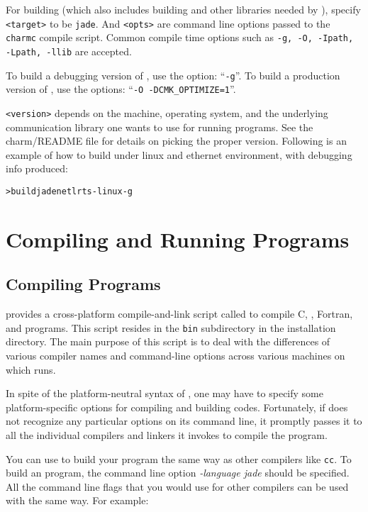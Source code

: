 \documentclass[10pt]{article}
\begin{document}
For building \jade (which also includes building \charmpp{} and other
libraries needed by \jade), specify \verb+<target>+ to be \verb+jade+. And
\verb+<opts>+ are command line options passed to the \verb+charmc+ compile
script.  Common compile time options such as \texttt{-g, -O, -Ipath, -Lpath,
-llib} are accepted. 

To build a debugging version of \jade, use the option: ``\texttt{-g}''. 
To build a production version of \jade, use the options: ``\texttt{-O 
-DCMK\_OPTIMIZE=1}''.

\verb+<version>+ depends on the machine, operating system, and the underlying
communication library one wants to use for running \jade programs.
See the charm/README file for details on picking the proper version.
Following is an example of how to build \jade under linux and ethernet
environment, with debugging info produced:

\begin{alltt}
> build jade netlrts-linux -g
\end{alltt}

\section{Compiling and Running \jade Programs}
\subsection{Compiling \jade Programs}

\charmpp{} provides a cross-platform compile-and-link script called \charmc{}
to compile C, \CC{}, Fortran, \charmpp{} and \jade programs.  This script
resides in the \texttt{bin} subdirectory in the \charmpp{} installation
directory. The main purpose of this script is to deal with the differences of
various compiler names and command-line options across various machines on
which \charmpp{} runs.

In spite of the platform-neutral syntax of \charmc{}, one may have to specify
some platform-specific options for compiling and building \jade codes.
Fortunately, if \charmc{} does not recognize any particular options on its
command line, it promptly passes it to all the individual compilers and linkers
it invokes to compile the program.

You can use \charmc{} to build your \jade program the same way as other
compilers like \texttt{cc}.  To build an \jade program, the command line 
option \emph{-language jade} should be specified. All the command line 
flags that you would use for other compilers can be used with \charmc the 
same way. For example:
\end{document}
